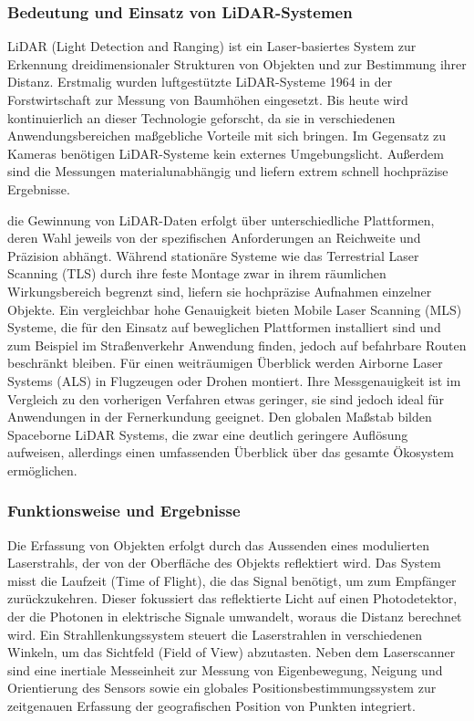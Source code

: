 \subsubsection{Bedeutung und Einsatz von LiDAR-Systemen}

LiDAR (Light Detection and Ranging) ist ein Laser-basiertes System zur Erkennung dreidimensionaler Strukturen von Objekten und zur Bestimmung ihrer Distanz. 
Erstmalig wurden luftgestützte LiDAR-Systeme 1964 in der Forstwirtschaft zur Messung von Baumhöhen eingesetzt. Bis heute wird kontinuierlich an dieser Technologie geforscht, da sie in verschiedenen Anwendungsbereichen maßgebliche Vorteile mit sich bringen. Im Gegensatz zu Kameras benötigen LiDAR-Systeme kein externes Umgebungslicht. Außerdem sind die Messungen materialunabhängig und liefern extrem schnell hochpräzise Ergebnisse.

die Gewinnung von LiDAR-Daten erfolgt über unterschiedliche Plattformen, deren Wahl jeweils von der spezifischen Anforderungen an Reichweite und Präzision abhängt. Während stationäre Systeme wie das Terrestrial Laser Scanning (TLS) durch ihre feste Montage zwar in ihrem räumlichen Wirkungsbereich begrenzt sind, liefern sie hochpräzise Aufnahmen einzelner Objekte. Ein vergleichbar hohe Genauigkeit bieten Mobile Laser Scanning (MLS) Systeme, die für den Einsatz auf beweglichen Plattformen installiert sind und zum Beispiel im Straßenverkehr Anwendung finden, jedoch auf befahrbare Routen beschränkt bleiben. Für einen weiträumigen Überblick werden Airborne Laser Systems (ALS) in Flugzeugen oder Drohen montiert. Ihre Messgenauigkeit ist im Vergleich zu den vorherigen Verfahren etwas geringer, sie sind jedoch ideal für Anwendungen in der Fernerkundung geeignet. Den globalen Maßstab bilden Spaceborne LiDAR Systems, die zwar eine deutlich geringere Auflösung aufweisen, allerdings einen umfassenden Überblick über das gesamte Ökosystem ermöglichen. 



\subsubsection{Funktionsweise und Ergebnisse}

Die Erfassung von Objekten erfolgt durch das Aussenden eines modulierten Laserstrahls, der von der Oberfläche des Objekts reflektiert wird. Das System misst die Laufzeit (Time of Flight), die das Signal benötigt, um zum Empfänger zurückzukehren. Dieser fokussiert das reflektierte Licht auf einen Photodetektor, der die Photonen in elektrische Signale umwandelt, woraus die Distanz berechnet wird. Ein Strahllenkungssystem steuert die Laserstrahlen in verschiedenen Winkeln, um das Sichtfeld (Field of View) abzutasten. Neben dem Laserscanner sind eine inertiale Messeinheit zur Messung von Eigenbewegung, Neigung und Orientierung des Sensors sowie ein globales Positionsbestimmungssystem zur zeitgenauen Erfassung der geografischen Position von Punkten integriert.

